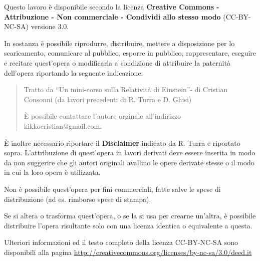 Questo lavoro è disponibile secondo la licenza \textbf{Creative Commons - Attribuzione - Non commerciale - Condividi allo stesso modo}
(CC-BY-NC-SA) versione 3.0.

In sostanza è possibile riprodurre, distribuire, mettere a disposizione per lo scaricamento, 
comunicare al pubblico, esporre in pubblico, rappresentare, eseguire e recitare quest'opera
o modificarla a condizione di attribuire la paternità dell'opera riportando la seguente indicazione:
\begin{quote}

\textup{\textsf{Tratto da ``Un mini-corso sulla Relatività di Einstein''- di Cristian Consonni (da lavori precedenti di R. Turra e D. Ghisi)}}

\textup{\textsf{È possibile contattare l'autore orginale all'indirizzo kikkocristian@gmail.com.}}
\end{quote}

È inoltre necessario riportare il \textbf{Disclaimer} indicato da R. Turra e riportato sopra.
L'attribuzione di quest'opera in lavori derivati deve essere inserita in modo da non suggerire che gli autori originali 
avallino le opere derivate stesse o il modo in cui la loro opera è utilizzata.

Non è possibile quest'opera per fini commerciali, fatte salve le spese di distribuzione (ad es. rimborso spese di stampa).

Se si altera o trasforma quest'opera, o se la si usa per crearne un'altra, è possibile distribuire l'opera risultante solo 
con una licenza identica o equivalente a questa. 

Ulteriori informazioni ed il testo completo della licenza CC-BY-NC-SA sono disponibili alla 
pagina \url{http://creativecommons.org/licenses/by-nc-sa/3.0/deed.it}
